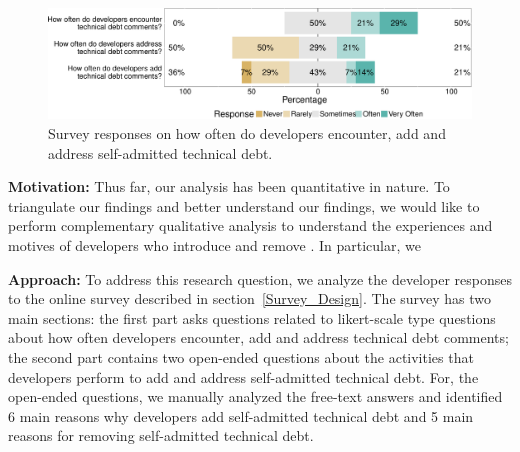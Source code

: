 
\begin{figure}[!tb]
	\centering
	\includegraphics[width=\columnwidth]{figures/test/responses_question.pdf}
	\caption{Survey responses on how often do developers encounter, add and address self-admitted technical debt.}
	\label{fig:encouner_add_address}
\end{figure}


 \noindent\rqiv

\noindent \textbf{Motivation:} 
Thus far, our analysis has been quantitative in nature. To triangulate our findings and better understand our findings, we would like to perform complementary qualitative analysis to understand the experiences and motives of developers who introduce and remove \SATD. In particular, we 


 
\noindent \textbf{Approach:} 
To address this research question, we analyze the developer responses to the online survey described in section~\ref{Survey_Design}. The survey has two main sections: the first part asks questions related to likert-scale type questions about how often developers encounter, add and address technical debt comments; the second part contains two open-ended questions about the activities that developers perform to add and address self-admitted technical debt. For, the open-ended questions, we manually analyzed the free-text answers and identified 6 main reasons why developers add self-admitted technical debt and 5 main reasons for removing self-admitted technical debt.


